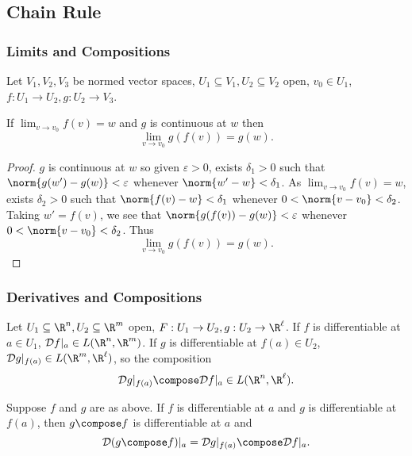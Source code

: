 \documentclass[a4paper]{article}
\newcommand*{\D}{\mathcal{D}}
\theoremstyle{definition}
\begin{document}
\subsection{Chain Rule}

\subsubsection{Limits and Compositions}

Let \(V_1, V_2, V_3\) be normed vector spaces, \(U_1 \subseteq V_1, U_2 \subseteq V_2\) open, \(v_0 \in U_1\), \(f: U_1 \to U_2, g: U_2 \to V_3\).

\begin{lemma}
  If \(\lim_{v \to v_0} f(v) = w\) and \(g\) is continuous at \(w\) then
  \[
    \lim_{v \to v_0} g(f(v)) = g(w).
  \]
\end{lemma}

\begin{proof}
  \(g\) is continuous at \(w\) so given \(\varepsilon > 0\), exists \(\delta_1 > 0\) such that \(\norm{g(w') - g(w)} < \varepsilon\) whenever \(\norm{w' - w} < \delta_1\). As \(\lim_{v \to v_0} f(v) = w\), exists \(\delta_2 > 0\) such that \(\norm{f(v) - w} < \delta_1\) whenever \(0 < \norm{v - v_0} < \delta_2\). Taking \(w' = f(v)\), we see that \(\norm{g(f(v)) - g(w)} < \varepsilon\) whenever \(0 < \norm{v - v_0} < \delta_2\). Thus
  \[
    \lim_{v \to v_0} g(f(v)) = g(w).
  \]
\end{proof}

\subsubsection{Derivatives and Compositions}

Let \(U_1 \subseteq \R^n, U_2 \subseteq \R^m\) open, \(F: U_1 \to U_2, g: U_2 \to \R^\ell\). If \(f\) is differentiable at \(a \in U_1\), \(\D f|_a \in L(\R^n, \R^m)\). If \(g\) is differentiable at \(f(a) \in U_2\), \(\D g|_{f(a)} \in L(\R^m, \R^\ell)\), so the composition
\[
  \D g|_{f(a)} \compose \D f|_a \in L(\R^n, \R^\ell).
\]

\begin{theorem}
  Suppose \(f\) and \(g\) are as above. If \(f\) is differentiable at \(a\) and \(g\) is differentiable at \(f(a)\), then \(g \compose f\) is differentiable at \(a\) and
  \[
    \D (g \compose f)|_a = \D g|_{f(a)} \compose \D f|_a.
  \]
\end{theorem}
\end{document}
